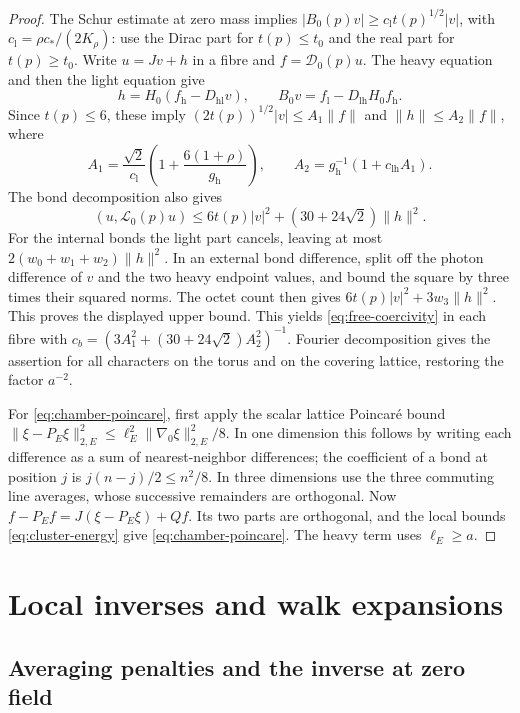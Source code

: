 \begin{proof}
The Schur estimate at zero mass implies
$|B_0(p)v|\ge c_{\mathrm l}t(p)^{1/2}|v|$, with
$c_{\mathrm l}=\rho c_*/(2K_\rho)$: use the Dirac part for
$t(p)\le t_0$ and the real part for $t(p)\ge t_0$.
Write $u=Jv+h$ in a fibre and $f=\mathcal D_0(p)u$. The heavy equation
and then the light equation give
\[
 h=H_0(f_{\mathrm h}-D_{\mathrm{hl}}v),\qquad
 B_0v=f_{\mathrm l}-D_{\mathrm{lh}}H_0f_{\mathrm h}.
\]
Since $t(p)\le6$, these imply
$(2t(p))^{1/2}|v|\le A_1\|f\|$ and $\|h\|\le A_2\|f\|$, where
\[
 A_1=\frac{\sqrt2}{c_{\mathrm l}}
         \left(1+\frac{6(1+\rho)}{g_{\mathrm h}}\right),\qquad
 A_2=g_{\mathrm h}^{-1}(1+c_{\mathrm{lh}}A_1).
\]
The bond decomposition also gives
\[
 (u,\mathcal L_0(p)u)\le6t(p)|v|^2+(30+24\sqrt2)\|h\|^2.
\]
For the internal bonds the light part cancels, leaving at most
$2(w_0+w_1+w_2)\|h\|^2$. In an external bond difference, split off
the photon difference of $v$ and the two heavy endpoint values, and
bound the square by three times their squared norms. The octet count
then gives $6t(p)|v|^2+3w_3\|h\|^2$. This proves the displayed
upper bound.
This yields \eqref{eq:free-coercivity} in each fibre with
$c_b=(3A_1^2+(30+24\sqrt2)A_2^2)^{-1}$.
Fourier decomposition gives the assertion for all characters on the
torus and on the covering lattice, restoring the factor $a^{-2}$.

For \eqref{eq:chamber-poincare}, first apply the scalar lattice
Poincar\'e bound
$\|\xi-P_E\xi\|_{2,E}^2\le\ell_E^2\|\nabla_0\xi\|_{2,E}^2/8$.
In one dimension this follows by writing each difference as a sum of
nearest-neighbor differences; the coefficient of a bond at position
$j$ is $j(n-j)/2\le n^2/8$. In three dimensions use the three commuting
line averages, whose successive remainders are orthogonal.
Now $f-P_Ef=J(\xi-P_E\xi)+Qf$. Its two parts are orthogonal, and the
local bounds \eqref{eq:cluster-energy} give
\eqref{eq:chamber-poincare}. The heavy term uses $\ell_E\ge a$.
\end{proof}

\section{Local inverses and walk expansions}\label{sec:local-walks}

\subsection{Averaging penalties and the inverse at zero field}
\label{subsec:blocked-zero-inverse}

